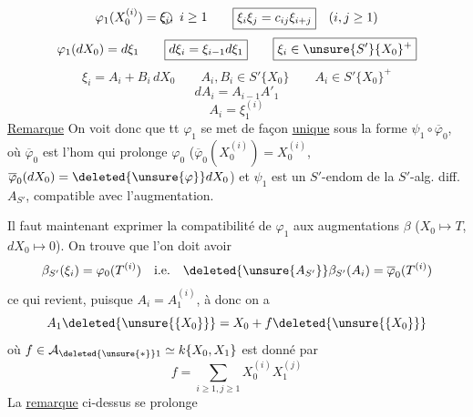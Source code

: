 \[
\varphi_1(X_0^{(i)})=\text{\textcircled{$\xi_i,\ i\geq1$}}\qquad\boxed{\xi_i\xi_j=c_{ij}\xi_{i+j}}\quad(i,j\geq1)
\]
\[
\varphi_1(dX_0)=d\xi_1\qquad\boxed{d\xi_i=\xi_{i-1}d\xi_1}\qquad\boxed{\xi_i\in\unsure{S'}\{X_0\}^+}
\]
\[
\xi_i=A_i+B_i\,dX_0\qquad A_i,B_i\in S'\{X_0\}\qquad A_i\in S'\{X_0\}^+
\]
\[
dA_i=A_{i-1}A'_1
\]
\[
A_i=\xi_1^{(i)}
\]
\uline{Remarque} On voit donc que tt $\varphi_1$ se met de façon \uline{unique} sous la forme $\psi_1\circ\overline\varphi_0$, où $\overline\varphi_0$ est l'hom qui prolonge $\varphi_0$ ($\overline\varphi_0(X_0^{(i)})=X_0^{(i)}$, $\overline\varphi_0(dX_0)=\deleted{\unsure{\varphi}}dX_0$) et $\psi_1$ est un $S'$-endom de la $S'$-alg. diff. $A_{S'}$, compatible avec l'augmentation.

Il faut maintenant exprimer la compatibilité de $\varphi_1$ aux augmentations $\beta$  ($X_0\longmapsto T$,  $dX_0\longmapsto0$).
On trouve que l'on doit avoir
\[
\beta_{S'}(\xi_i)=\varphi_0(T^{(i)})\quad\text{i.e.}\quad\deleted{\unsure{A_{S'}}}\beta_{S'}(A_i)=\overline\varphi_0(T^{(i)})
\]
ce qui revient, puisque $A_i=A_1^{(i)}$, à
\inserted{\[
\left\{\begin{array}{l}
\beta_{S'}(A_1)=\overline\varphi_0(T)\\
\varphi_0(T^{(i)})=\varphi_0(T)^{(i)}
\end{array}\right.
\]}
donc on a
\[
A_1\deleted{\unsure{\{X_0\}}}=X_0+f\deleted{\unsure{\{X_0\}}}
\]
où $f\in\mathcal A_{\deleted{\unsure{*}}1}\simeq k\{X_0,X_1\}$ est donné par
\[
f=\sum_{i\geq1,j\geq1}X_0^{(i)}X_1^{(j)}
\]
La \uline{remarque} ci-dessus se prolonge 
